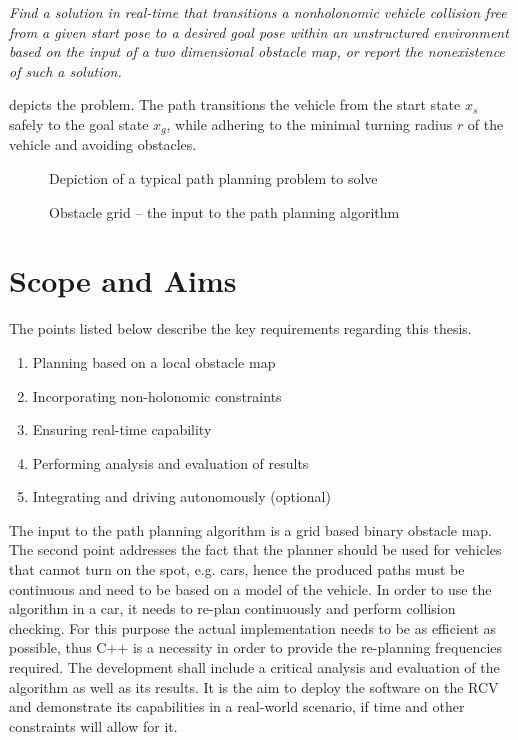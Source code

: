 \emph{Find a solution in real-time that transitions a nonholonomic vehicle collision free from a given start pose to a desired goal pose within an unstructured environment based on the input of a two dimensional obstacle map, or report the nonexistence of such a solution.}

 depicts the problem. The path transitions the vehicle from the start state $x_s$ safely to the goal state $x_g$, while adhering to the minimal turning radius $r$ of the vehicle and avoiding obstacles.

\begin{figure}[h]
\caption{Depiction of a typical path planning problem to solve}
\label{fig:problemDepiction}
\end{figure}

\begin{figure}[h]
\caption[Obstacle grid]{Obstacle grid -- the input to the path planning algorithm}
\label{fig:obstacleGrid}
\end{figure}

\section{Scope and Aims}
The points listed below describe the key requirements regarding this thesis.

\begin{enumerate}
    \item Planning based on a local obstacle map
    \item Incorporating non-holonomic constraints
    \item Ensuring real-time capability
    \item Performing analysis and evaluation of results
    \item Integrating and driving autonomously (optional)
\end{enumerate}

The input to the path planning algorithm is a grid based binary obstacle map. The second point addresses the fact that the planner should be used for vehicles that cannot turn on the spot, e.g. cars, hence the produced paths must be continuous and need to be based on a model of the vehicle. In order to use the algorithm in a car, it needs to re-plan continuously and perform collision checking. For this purpose the actual implementation needs to be as efficient as possible, thus C++ is a necessity in order to provide the re-planning frequencies required. The development shall include a critical analysis and evaluation of the algorithm as well as its results. It is the aim to deploy the software on the RCV and demonstrate its capabilities in a real-world scenario, if time and other constraints will allow for it.


